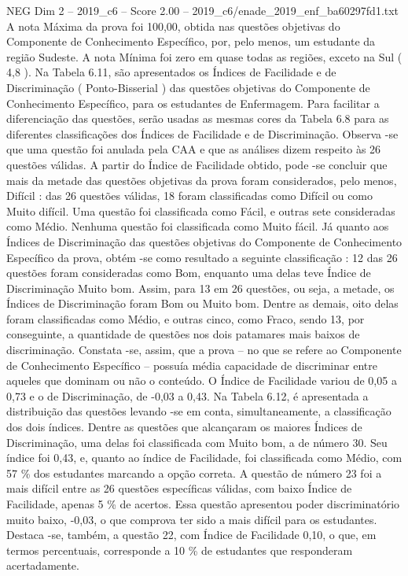 \begin{textsample}{NEG Dim 2 – 2019\_c6 – Score 2.00 – 2019\_c6/enade\_2019\_enf\_ba60297fd1.txt}
A nota Máxima da prova foi 100,00, obtida nas questões objetivas do Componente de Conhecimento Específico, por, pelo menos, um estudante da região Sudeste.
A nota Mínima foi zero em quase todas as regiões, exceto na Sul ( 4,8 ).
Na Tabela 6.11, são apresentados os Índices de Facilidade e de Discriminação ( Ponto-Bisserial ) das questões objetivas do Componente de Conhecimento Específico, para os estudantes de Enfermagem.
Para facilitar a diferenciação das questões, serão usadas as mesmas cores da Tabela 6.8 para as diferentes classificações dos Índices de Facilidade e de Discriminação.
Observa -se que uma questão foi anulada pela CAA e que as análises dizem respeito às 26 questões válidas.
A partir do Índice de Facilidade obtido, pode -se concluir que mais da metade das questões objetivas da prova foram considerados, pelo menos, Difícil : das 26 questões válidas, 18 foram classificadas como Difícil ou como Muito difícil.
Uma questão foi classificada como Fácil, e outras sete consideradas como Médio.
Nenhuma questão foi classificada como Muito fácil.
Já quanto aos Índices de Discriminação das questões objetivas do Componente de Conhecimento Específico da prova, obtém -se como resultado a seguinte classificação : 12 das 26 questões foram consideradas como Bom, enquanto uma delas teve Índice de Discriminação Muito bom.
Assim, para 13 em 26 questões, ou seja, a metade, os Índices de Discriminação foram Bom ou Muito bom.
Dentre as demais, oito delas foram classificadas como Médio, e outras cinco, como Fraco, sendo 13, por conseguinte, a quantidade de questões nos dois patamares mais baixos de discriminação.
Constata -se, assim, que a prova – no que se refere ao Componente de Conhecimento Específico – possuía média capacidade de discriminar entre aqueles que dominam ou não o conteúdo.
O Índice de Facilidade variou de 0,05 a 0,73 e o de Discriminação, de -0,03 a 0,43.
Na Tabela 6.12, é apresentada a distribuição das questões levando -se em conta, simultaneamente, a classificação dos dois índices.
Dentre as questões que alcançaram os maiores Índices de Discriminação, uma delas foi classificada com Muito bom, a de número 30.
Seu índice foi 0,43, e, quanto ao índice de Facilidade, foi classificada como Médio, com 57 \% dos estudantes marcando a opção correta.
A questão de número 23 foi a mais difícil entre as 26 questões específicas válidas, com baixo Índice de Facilidade, apenas 5 \% de acertos.
Essa questão apresentou poder discriminatório muito baixo, -0,03, o que comprova ter sido a mais difícil para os estudantes.
Destaca -se, também, a questão 22, com Índice de Facilidade 0,10, o que, em termos percentuais, corresponde a 10 \% de estudantes que responderam acertadamente.

\end{textsample}
